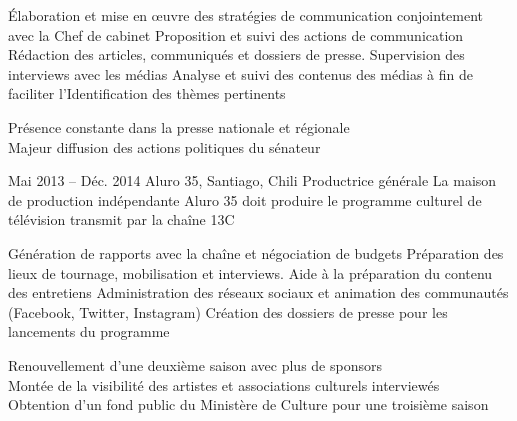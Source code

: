 \documentclass[30pt, french]{tccv}
\begin{document}
\begin{upshape}
\begin{experience}
    \setlength{\parskip}{-10pt}
    \begin{itemize}
      \setlength\itemsep{-3pt} 
      \cvitem[\checkmark] Élaboration et mise en œuvre des stratégies de communication conjointement avec la Chef de cabinet
      \cvitem[\checkmark] Proposition et suivi des actions de communication
      \cvitem[\checkmark] Rédaction des articles, communiqués et dossiers de presse. Supervision des interviews avec les médias
      \cvitem[\checkmark] Analyse et suivi des contenus des médias à fin de faciliter l'Identification des thèmes pertinents
      
    \end{itemize}     
 Présence constante dans la presse nationale et régionale  \\
\mission{}            Majeur diffusion des actions politiques du sénateur
    
    
    
\setlength{\parskip}{0pt}        
\item{Mai 2013 -- Déc. 2014}
     {Aluro 35, Santiago, Chili}
     {Productrice générale}
     \fontsize{9pt}{1em}\color{text}\bodyfontlight\upshape\selectfont
%
 La maison de production indépendante Aluro 35 doit produire le programme culturel de télévision  transmit par la chaîne 13C \\
    
    \setlength{\parskip}{-10pt}
    \begin{itemize}
      \setlength\itemsep{-3pt} 
      \cvitem[\checkmark] Génération de rapports avec la chaîne et négociation de budgets                       
      \cvitem[\checkmark] Préparation des lieux de tournage, mobilisation et interviews. Aide à la préparation du contenu des entretiens 
      \cvitem[\checkmark] Administration des réseaux sociaux et animation des communautés (Facebook, Twitter, Instagram)                 
      \cvitem[\checkmark] Création des dossiers de presse pour les lancements du programme                                             
    \end{itemize}     
 Renouvellement d'une deuxième saison avec plus de sponsors \\
\mission{}	     Montée de la visibilité des artistes et associations culturels interviewés \\
\mission{}           Obtention d’un fond public du Ministère de Culture pour une troisième saison  \\





\end{experience}
\end{upshape}
\end{document}
